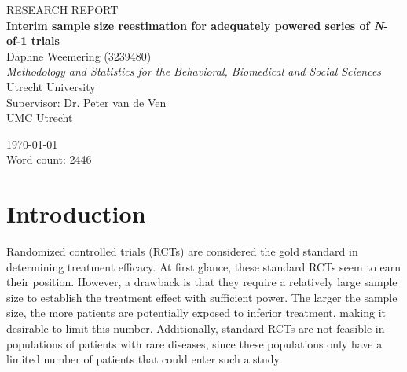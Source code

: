 \documentclass[11pt]{article}
\begin{document}
\begin{titlepage}
\begin{center}

\vspace*{0.01cm}
RESEARCH REPORT \\

\vspace{2cm}
\Large
\textbf{Interim sample size reestimation for adequately powered series of \textit{N}-of-1 trials} \\

\vspace{2cm}
\large
{Daphne Weemering (3239480)} \\

\vspace{0.3cm}
\large
\textit{Methodology and Statistics for the Behavioral, Biomedical and Social Sciences} \\
\vspace{0.3cm}
Utrecht University \\

\vspace{1cm}
\large
Supervisor: Dr. Peter van de Ven  \\

\vspace{0.3cm}
UMC Utrecht 

\vspace{2cm}
\large 
\today \\

\vspace{6cm}
Word count: 2446

\end{center}
\end{titlepage}



\section{Introduction} \label{Introduction}
Randomized controlled trials (RCTs) are considered the gold standard in determining treatment efficacy. At first glance, these standard RCTs seem to earn their position. However, a drawback is that they require a relatively large sample size to establish the treatment effect with sufficient power. The larger the sample size, the more patients are potentially exposed to inferior treatment, making it desirable to limit this number. Additionally, standard RCTs are not feasible in populations of patients with rare diseases, since these populations only have a limited number of patients that could enter such a study.
\end{document}
